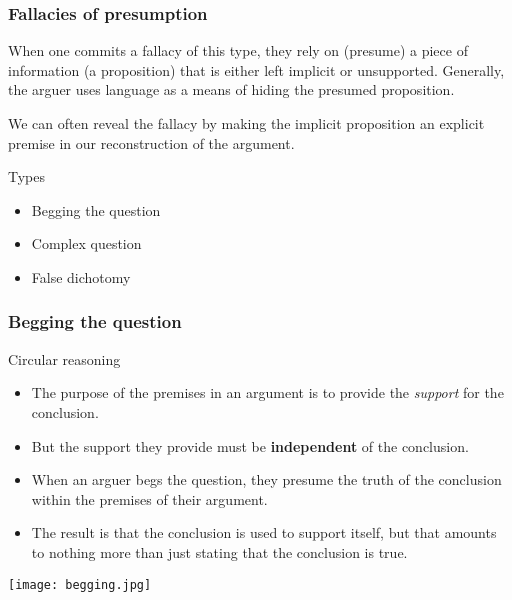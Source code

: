 \documentclass[10pt,letterpaper,xcolor=dvipsnames]{beamer}
\begin{document}
\begin{frame}
\frametitle{Fallacies of presumption}

When one commits a fallacy of this type, they rely on (presume) a piece of information (a proposition) that is either left implicit or unsupported.  Generally, the arguer uses language as a means of hiding the presumed proposition.

We can often reveal the fallacy by making the implicit proposition an explicit premise in our reconstruction of the argument.

\begin{block}{Types}
  \begin{itemize}
    \item Begging the question
    \item Complex question
    \item False dichotomy
  \end{itemize}
\end{block}

\end{frame}

\begin{frame}
  \frametitle{Begging the question}
  \small
  
  \begin{block}{Circular reasoning}
    \begin{itemize}
      \item The purpose of the premises in an argument is to provide the \textit{support} for the conclusion.
      \item But the support they provide must be \textbf{independent} of the conclusion.
      \item When an arguer begs the question, they presume the truth of the conclusion within the premises of their argument.
      \item The result is that the conclusion is used to support itself, but that amounts to nothing more than just stating that the conclusion is true.
    \end{itemize}
  \end{block}
  
  
  \begin{center}
    \texttt{[image: begging.jpg]}
  \end{center}
  
\end{frame}
\end{document}
